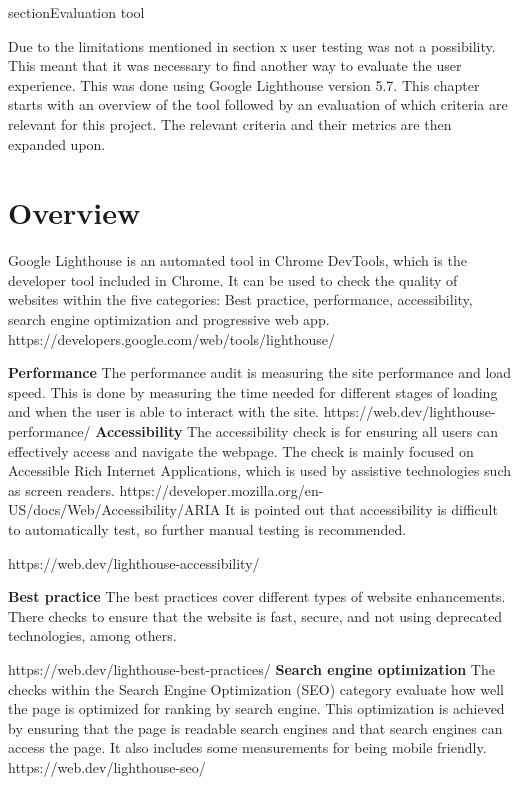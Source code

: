 section{Evaluation tool}

Due to the limitations mentioned in section x user testing was not a possibility. This meant that it was necessary to find another way to evaluate the user experience. This was done using Google Lighthouse version 5.7. 
This chapter starts with an overview of the tool followed by an evaluation of which criteria are relevant for this project. The relevant criteria and their metrics are then expanded upon.

\section{Overview}
Google Lighthouse is an automated tool in Chrome DevTools, which is the developer tool included in Chrome. It can be used to check the quality of websites within the five categories: Best practice, performance, accessibility, search engine optimization and progressive web app. 
https://developers.google.com/web/tools/lighthouse/


\textbf{Performance}
The performance audit is measuring the site performance and load speed. This is done by measuring the time needed for different stages of loading and when the user is able to interact with the site. 
https://web.dev/lighthouse-performance/
\textbf{Accessibility}
The accessibility check is for ensuring all users can effectively access and navigate the webpage. 
The check is mainly focused on Accessible Rich Internet Applications, which is used by assistive technologies such as screen readers.
https://developer.mozilla.org/en-US/docs/Web/Accessibility/ARIA
It is pointed out that accessibility is difficult to automatically test, so further manual testing is recommended. 

https://web.dev/lighthouse-accessibility/

\textbf{Best practice}
The best practices cover different types of website enhancements. There checks to ensure that the website is fast, secure, and not using deprecated technologies, among others. 

https://web.dev/lighthouse-best-practices/
\textbf{Search engine optimization}
The checks within the Search Engine Optimization (SEO) category evaluate how well the page is optimized for ranking by search engine. This optimization is achieved by ensuring that the page is readable search engines and that search engines can access the page. It also includes some measurements for being mobile friendly.
https://web.dev/lighthouse-seo/

